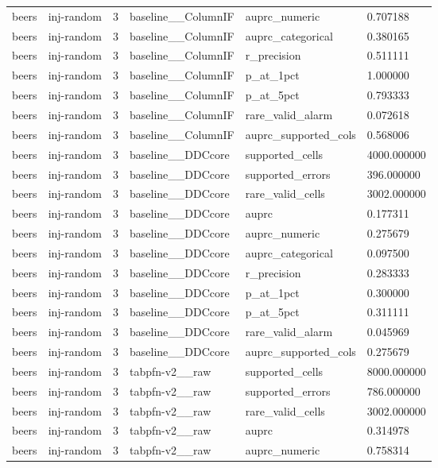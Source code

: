\begin{tabular}{llllll}
beers & inj-random & 3 & baseline\_\_ColumnIF & auprc\_numeric & 0.707188 \\
beers & inj-random & 3 & baseline\_\_ColumnIF & auprc\_categorical & 0.380165 \\
beers & inj-random & 3 & baseline\_\_ColumnIF & r\_precision & 0.511111 \\
beers & inj-random & 3 & baseline\_\_ColumnIF & p\_at\_1pct & 1.000000 \\
beers & inj-random & 3 & baseline\_\_ColumnIF & p\_at\_5pct & 0.793333 \\
beers & inj-random & 3 & baseline\_\_ColumnIF & rare\_valid\_alarm & 0.072618 \\
beers & inj-random & 3 & baseline\_\_ColumnIF & auprc\_supported\_cols & 0.568006 \\
beers & inj-random & 3 & baseline\_\_DDCcore & supported\_cells & 4000.000000 \\
beers & inj-random & 3 & baseline\_\_DDCcore & supported\_errors & 396.000000 \\
beers & inj-random & 3 & baseline\_\_DDCcore & rare\_valid\_cells & 3002.000000 \\
beers & inj-random & 3 & baseline\_\_DDCcore & auprc & 0.177311 \\
beers & inj-random & 3 & baseline\_\_DDCcore & auprc\_numeric & 0.275679 \\
beers & inj-random & 3 & baseline\_\_DDCcore & auprc\_categorical & 0.097500 \\
beers & inj-random & 3 & baseline\_\_DDCcore & r\_precision & 0.283333 \\
beers & inj-random & 3 & baseline\_\_DDCcore & p\_at\_1pct & 0.300000 \\
beers & inj-random & 3 & baseline\_\_DDCcore & p\_at\_5pct & 0.311111 \\
beers & inj-random & 3 & baseline\_\_DDCcore & rare\_valid\_alarm & 0.045969 \\
beers & inj-random & 3 & baseline\_\_DDCcore & auprc\_supported\_cols & 0.275679 \\
beers & inj-random & 3 & tabpfn-v2\_\_raw & supported\_cells & 8000.000000 \\
beers & inj-random & 3 & tabpfn-v2\_\_raw & supported\_errors & 786.000000 \\
beers & inj-random & 3 & tabpfn-v2\_\_raw & rare\_valid\_cells & 3002.000000 \\
beers & inj-random & 3 & tabpfn-v2\_\_raw & auprc & 0.314978 \\
beers & inj-random & 3 & tabpfn-v2\_\_raw & auprc\_numeric & 0.758314 \\

\end{tabular}
